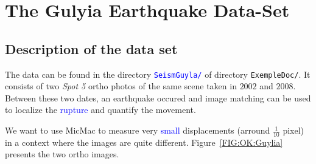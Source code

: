 


\section{The Gulyia Earthquake Data-Set}

\subsection{Description of the data set}

The data can be found in the directory {\tt \textcolor{blue}{SeismGuyla/}} %
 of directory {\tt ExempleDoc/}. %
It consists of  two \emph{Spot 5} ortho photos of the same scene taken in $2002$ and
$2008$. Between these two dates, an earthquake occured and image matching can be used to
localize the \textcolor{blue}{rupture} and quantify the movement.

We want to use MicMac to measure very \textcolor{blue}{small} displacements (arround $\frac{1}{10}$ pixel) in
a context where the images are quite different. Figure~\ref{FIG:OK:Guylia} presents the two
ortho images.

